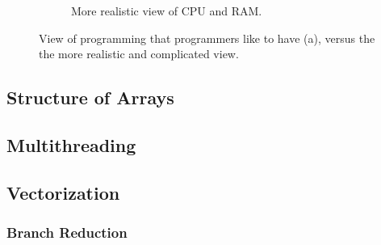 \begin{figure}[h]
\begin{subfigure}{0.4\textwidth}
\caption{More realistic view of CPU and RAM.} \label{fig:1b}
\end{subfigure}
\label{fig:cpu-and-ram}
\caption{View of programming that programmers like to have (a), versus the the more realistic
and complicated view.}
\end{figure}


\subsection{Structure of Arrays}

\subsection{Multithreading}

\subsection{Vectorization}
\subsubsection{Branch Reduction}



